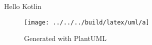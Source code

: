 \documentclass{article}
\begin{document}
    Hello Kotlin\cite{KotlinRelease}
    \begin{figure}
        \centering
        \texttt{[image: ../../../build/latex/uml/a]}
        \caption{Generated with PlantUML}
        \label{fig:gen}
    \end{figure}
    \newpage
    \printbibliography
\end{document}
